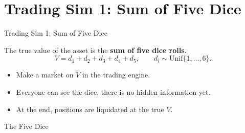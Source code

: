 


\section{Trading Sim 1: Sum of Five Dice}

\begin{frame}{Trading Sim 1: Sum of Five Dice}
  \begin{sqt:definition}
    The true value of the asset is the \textbf{sum of five dice rolls}.
    $$V = d_1 + d_2 + d_3 + d_4 + d_5, \qquad d_i \sim \mathrm{Unif}\{1,\dots,6\}.$$
  \end{sqt:definition}

  \begin{itemize}
    \item Make a market on $V$ in the trading engine.
    \item Everyone can see the dice, there is no hidden information yet.
    \item At the end, positions are liquidated at the true $V$.
  \end{itemize}

\end{frame}

\begin{frame}{The Five Dice}
  \begin{center}
    \vspace{0.4cm}
    \hfill
    \hfill
    \hfill
    \hfill

    \vspace{0.8cm}
  \end{center}
\end{frame}


